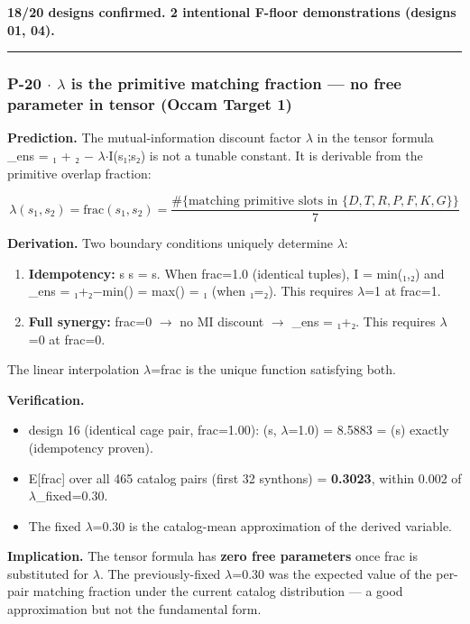 \documentclass[12pt,a4paper]{article}
\begin{document}
\textbf{18/20 designs confirmed. 2 intentional F-floor demonstrations (designs 01, 04).}

\begin{center}
\rule{0.5\textwidth}{0.4pt}
\end{center}

\subsubsection{P-20 $\cdot$ $\lambda$ is the primitive matching fraction --- no free parameter in tensor (Occam Target 1)}

\textbf{Prediction.} The mutual-information discount factor $\lambda$ in the tensor formula \xi\_ens = \xi₁ + \xi₂ $-$ $\lambda$$\cdot$I(s₁;s₂) is not a tunable constant. It is derivable from the primitive overlap fraction:

\[\lambda(s_1, s_2) = \mathrm{frac}(s_1, s_2) = \frac{\#\{\text{matching primitive slots in } \{D,T,R,P,F,K,G\}\}}{7}\]

\textbf{Derivation.} Two boundary conditions uniquely determine $\lambda$:

\begin{enumerate}
    \item \textbf{Idempotency:} s \otimes s = s. When frac=1.0 (identical tuples), I = min(\xi₁,\xi₂) and \xi\_ens = \xi₁+\xi₂$-$min(\xi) = max(\xi) = \xi₁ (when \xi₁=\xi₂). This requires $\lambda$=1 at frac=1. 
    \item \textbf{Full synergy:} frac=0 $\rightarrow$ no MI discount $\rightarrow$ \xi\_ens = \xi₁+\xi₂. This requires $\lambda$=0 at frac=0. 
\end{enumerate}

The linear interpolation $\lambda$=frac is the unique function satisfying both.

\textbf{Verification.}

\begin{itemize}
    \item design 16 (identical cage pair, frac=1.00): \xi(s\otimess, $\lambda$=1.0) = 8.5883 = \xi(s) exactly (idempotency proven). 
    \item E{[}frac{]} over all 465 catalog pairs (first 32 synthons) = \textbf{0.3023}, within 0.002 of $\lambda$\_fixed=0.30.
    \item The fixed $\lambda$=0.30 is the catalog-mean approximation of the derived variable.
\end{itemize}

\textbf{Implication.} The tensor formula has \textbf{zero free parameters} once frac is substituted for $\lambda$. The previously-fixed $\lambda$=0.30 was the expected value of the per-pair matching fraction under the current catalog distribution --- a good approximation but not the fundamental form.
\end{document}
